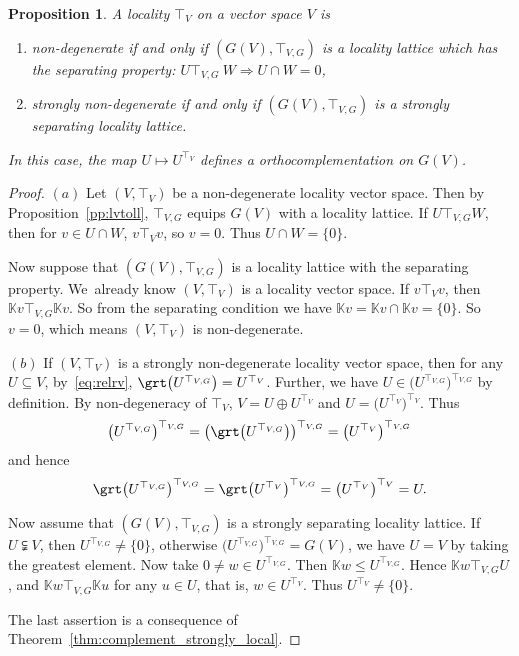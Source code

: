 \documentclass[10pt,a4paper]{amsart}
\numberwithin{equation}{section}
\newtheorem{Proposition}[Theorem]{Proposition}
\newcommand{\K}{\mathbb{K}}
\newcommand{\loc}{locality\xspace}
\begin{document}
\begin {Proposition}
\label {prop:VGV2}
A locality $\top _V$ on a vector space $V$ is
\begin{enumerate}
\item %
non-degenerate if and only if $(G(V),\top_{V,G})$ is a \loc lattice which has the separating property:
$U \top_{V,G}\ W\Rightarrow U\cap W=0$,
\item %
strongly non-degenerate if and only if $(G(V),\top_{V,G})$ is a strongly separating \loc lattice.
\end{enumerate}
In this case, the map $U\mapsto U^{\top_V}$ defines a orthocomplementation on $G(V)$.
\end{Proposition}
	
\begin {proof}
$(a)$
Let $(V,\top_V)$ be a non-degenerate \loc vector space. Then by Proposition~\ref{pp:lvtoll}, $\top_{V,G}$ equips $G(V)$ with a \loc lattice. If $U\top_{V,G} W$, then for $v\in U\cap W$, $v\top _V v$, so $v=0.$ Thus $U \cap W =\{0\}$.

Now suppose that $(G(V), \top_{V,G})$ is a \loc lattice with the separating property. We~already know $(V, \top _V)$ is a locality vector space. If $v\top _V v$, then $\K v\top _{V,G} \K v$. So from the separating condition we have $\K v=\K v\cap \K v=\{0\}$. So $v=0$, which means $(V, \top_V)$ is non-degenerate.


$(b)$
If $(V, \top _V )$ is a strongly non-degenerate locality vector space, then
for any $U\subseteq V$, by~\eqref{eq:relrv}, $\grt\big(U^{\top _{V,G}}\big)=U^{\top _V}$.
Further, we have $U\in \big(U^{\top _{V,G}}\big)^{\top _{V,G}}$ by definition. By non-degeneracy of $\top _V$, $V=U\oplus U^{\top _V}$ and $U=\big(U^{\top _V}\big)^{\top _V}$. Thus
\begin{gather*}
\big(U^{\top _{V,G}}\big)^{\top _{V,G}}=\big(\grt\big(U^{\top _{V,G}}\big)\big)^{\top _{V,G}}=\big(U^{\top _V}\big)^{\top _{V,G}}
\end{gather*}
and hence
\begin{gather*}
\grt \big(U^{\top _{V,G}}\big)^{\top _{V,G}}=\grt \big(U^{\top _V}\big)^{\top _{V,G}}=\big(U^{\top _V}\big)^{\top _V}=U.
\end{gather*}

Now assume that $(G(V), \top _{V,G})$ is a strongly separating \loc lattice. If $U\subsetneqq V$, then $U^{\top _{V,G}} \not =\{0\}$, otherwise $\big(U^{\top _{V,G}}\big)^{\top _{V,G}}=G(V)$, we have $U=V$ by taking the greatest element. Now take $0\neq w\in U^{\top _{V,G}}$. Then $\K w\leq U^{\top _{V,G}}$. Hence $\K w \top _{V,G} U$, and $\K w \top _{V,G} \K u$ for any $u\in U$, that is, $w\in U^{\top _V}$. Thus $U^{\top_V}\neq \{0\}$.

The last assertion is a consequence of Theorem~\ref{thm:complement_strongly_local}.
\end{proof}
\end{document}
